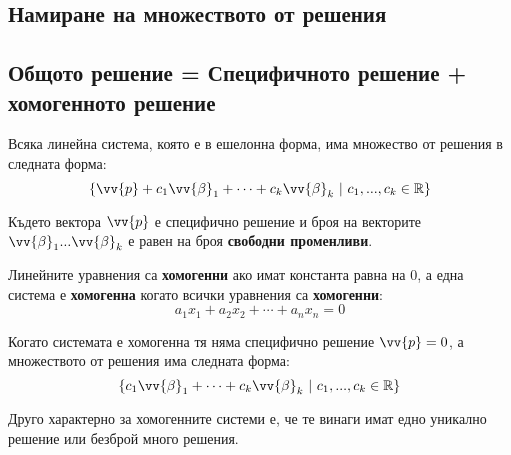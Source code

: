 \documentclass[12pt]{article}
\begin{document}
\subsection{Намиране на множеството от решения}






\subsection{Общото решение = Специфичното решение + хомогенното решение}

\noindent Всяка линейна система, която е в ешелонна форма, има множество от решения в следната форма:
\begin{equation*}
    \{ \vv{p} + c_{1}\vv{\beta}_{1} + \cdots + c_{k}\vv{\beta}_{k}\ |\ c_{1},...,c_{k} \in \mathbb{R}\}
\end{equation*}

\noindent Където вектора $\vv{p}$ е специфично решение и броя на векторите $\vv{\beta}_{1} ... \vv{\beta}_{k}$ е равен на броя \textbf{свободни променливи}.

\noindent Линейните уравнения са \textbf{хомогенни} ако имат константа равна на 0, а една система е \textbf{хомогенна} когато всички уравнения са \textbf{хомогенни}:
\begin{equation*}
    a_{1}x_{1} + a_{2}x_{2} + \cdots + a_{n}x_{n} = 0
\end{equation*}

\noindent Когато системата е хомогенна тя няма специфично решение $\vv{p} = 0$, а множеството от решения има следната форма:
\begin{equation*}
    \{ c_{1}\vv{\beta}_{1} + \cdots + c_{k}\vv{\beta}_{k}\ |\ c_{1},...,c_{k} \in \mathbb{R}\}
\end{equation*}

\noindent Друго характерно за хомогенните системи е, че те винаги имат едно уникално решение или безброй много решения.


\end{document}
